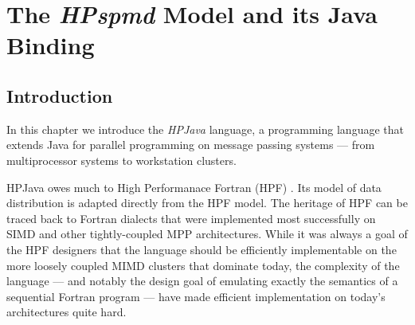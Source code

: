
\def\putfig#1#2{\mbox{ \def\epsfsize##1##2{#2##1} \epsfbox{#1}}}

\chapter[The HPspmd Model and its Java Binding]{The {\em HPspmd} Model and its Java Binding}
\label{zgs:chap}
\author[Guansong Zhang, Bryan Carpenter, Geoffrey Fox,\\
  Xinying Li, and Yuhong Wen]{Guansong Zhang, Bryan Carpenter, Geoffrey Fox,\\
  Xinying Li, and Yuhong Wen}







\section{Introduction}

In this chapter we introduce the  \emph{HPJava}
language, a programming language that extends Java for parallel
programming on message passing systems --- from multiprocessor systems to
workstation clusters.

HPJava owes much to High Performanace Fortran (HPF)
\cite{HPFStandard}.  Its model of data distribution is adapted directly
from the HPF model.  The heritage of HPF can be traced back to Fortran
dialects that were implemented most successfully on SIMD and other
tightly-coupled MPP architectures.  While it was always a goal of the
HPF designers that the language should be efficiently implementable on
the more loosely coupled MIMD clusters that dominate today, the
complexity of the language --- and notably the design goal of emulating
exactly the semantics of a sequential Fortran program --- have made
efficient implementation on today's architectures quite hard.

